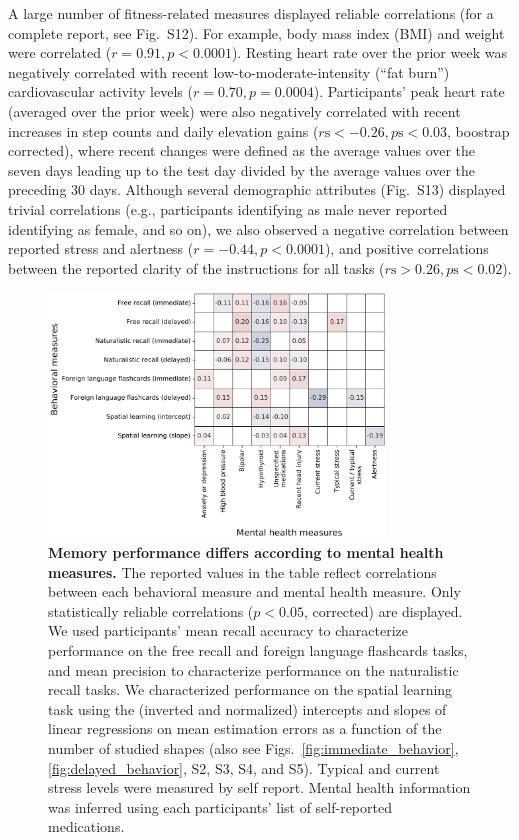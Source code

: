 \documentclass[10pt]{article}
\newcommand{\frDetail}{S2}
\newcommand{\natDetail}{S3}
\newcommand{\vocabDetail}{S4}
\newcommand{\spatialDetail}{S5}
\newcommand{\fitFitCorr}{S12}
\newcommand{\demDemCorr}{S13}
\begin{document}
A large number of fitness-related measures displayed reliable
correlations (for a complete report, see Fig.~\fitFitCorr).  For
example, body mass index (BMI) and weight were correlated
($r = 0.91, p < 0.0001$).  Resting heart rate over
the prior week was negatively correlated with recent
low-to-moderate-intensity (``fat burn'') cardiovascular
activity levels ($r = 0.70, p = 0.0004$).
Participants' peak heart rate (averaged over the prior week) were also
negatively correlated with recent increases in step counts and daily
elevation gains ($r\mathrm{s} < -0.26, p\mathrm{s} < 0.03$, boostrap
corrected), where recent changes were defined as the average values
over the seven days leading up to the test day divided by the average
values over the preceding 30 days.  Although several demographic
attributes (Fig.~\demDemCorr) displayed trivial correlations (e.g.,
participants identifying as male never reported identifying as female,
and so on), we also observed a negative correlation between reported
stress and alertness ($r = -0.44, p < 0.0001$), and
positive correlations between the reported clarity of the instructions for all
tasks ($r\mathrm{s} > 0.26, p\mathrm{s} < 0.02$).

\begin{figure}[tp]
\centering
\includegraphics[width=0.8\textwidth]{figs/corr_MH}
\caption{\textbf{Memory performance differs according to mental health
    measures.}  The reported values in the table reflect correlations
  between each behavioral measure and mental health measure.
  Only statistically reliable correlations ($p < 0.05$, corrected) are displayed. 
  We used participants' mean recall accuracy to characterize
  performance on the free recall and
  foreign language flashcards tasks, and mean precision to
  characterize performance on the naturalistic recall tasks.  We
  characterized performance on the spatial learning task using the
  (inverted and normalized)
  intercepts and slopes of linear regressions on mean estimation
  errors as a function of the number of studied shapes (also see
  Figs.~\ref{fig:immediate_behavior}, \ref{fig:delayed_behavior},
  \frDetail, \natDetail, \vocabDetail, and \spatialDetail).  Typical
  and current stress levels were measured by self report.  Mental
  health information was inferred using each participants' list of
  self-reported medications.}
\label{fig:mh_corr}
\end{figure}
\end{document}
